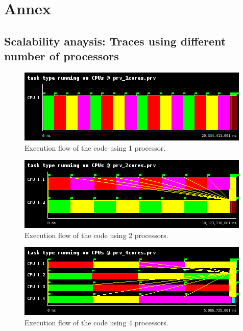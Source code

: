 \documentclass[12pt, a4paper]{article}
\begin{document}
\section{Annex}

\subsection{Scalability anaysis: Traces using different number of processors}

\begin{figure}[H]
	\centering
	\includegraphics[scale=0.75]{./images/S1_scalability/S1_scalability_1}
	
	\label{fig_ann:S1_scalability_1}
	\caption{Execution flow of the code using 1 processor.}
\end{figure}





\begin{figure}[H]
	\centering
	\includegraphics[scale=0.75]{./images/S1_scalability/S1_scalability_2}
	
	\label{fig_ann:S1_scalability_2}
	\caption{Execution flow of the code using 2 processors.}
\end{figure}





\begin{figure}[H]
	\centering
	\includegraphics[scale=0.75]{./images/S1_scalability/S1_scalability_4}
	
	\label{fig_ann:S1_scalability_4}
	\caption{Execution flow of the code using 4 processors.}
\end{figure}
\end{document}
